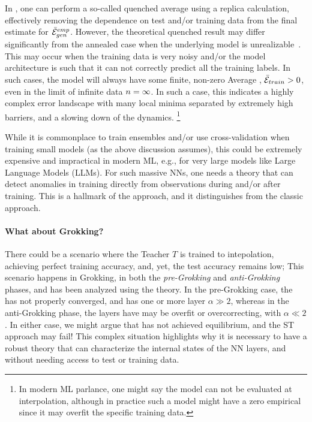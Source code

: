 In \STATMECH, one can perform a so-called quenched average using a replica calculation,
effectively removing the dependence on test and/or training data
from the final estimate for $\bar{\mathcal{E}}^{emp}_{gen}$.
However, the theoretical quenched result may differ significantly from the annealed case when the underlying model is unrealizable~\cite{SST92}. 
This may occur when the training data is very noisy and/or the model architecture is such that it can not correctly predict all the training labels.
In such cases, the model will always have some finite, non-zero Average \TrainingError, $\bar{\mathcal{E}}_{train} > 0$,
even in the \LargeN limit of infinite data $n=\infty$. In such a case, this indicates
a highly complex error landscape with many local minima separated by extremely high barriers,
and a slowing down of the dynamics.%
\footnote{In modern ML parlance, one might say the model can not be evaluated at interpolation, although 
in practice such a model might have a zero empirical \TrainingError since it may overfit the specific training data.}

While it is commonplace to train ensembles and/or use cross-validation when training small models (as the above discussion assumes),
this could be extremely expensive and impractical in modern ML, e.g., for very large models like Large Language Models (LLMs).
For such massive NNs, one needs a theory that can detect anomalies in training directly from observations during and/or after training.
This is a hallmark of the \SETOL approach, and it distinguishes \SETOL from the classic \STATMECH approach.

\paragraph{What about Grokking?} There could be a scenario where the Teacher $T$ is trained to intepolation, achieving perfect training accuracy, and, yet, the test accuracy remains low;
This scenario happens in Grokking,  in both the \emph{pre-Grokking} and \emph{anti-Grokking} 
phases, and has been analyzed using the \HTSR theory.\cite{prakash2025grokking}  
In the pre-Grokking case,  the \Teacher has not properly converged, and has one or more
layer $\alpha\gg 2$, whereas in the anti-Grokking phase, the layers have may be overfit
or overcorrecting, with $\alpha\ll 2$. In either case, we might argue that \Teacher has not 
achieved \Thermodynamic equilibrium, and the ST approach may fail!
This complex situation highlights why it is necessary to have a robust theory that
can characterize the internal states of the NN layers, and without needing access
to test or training data.



